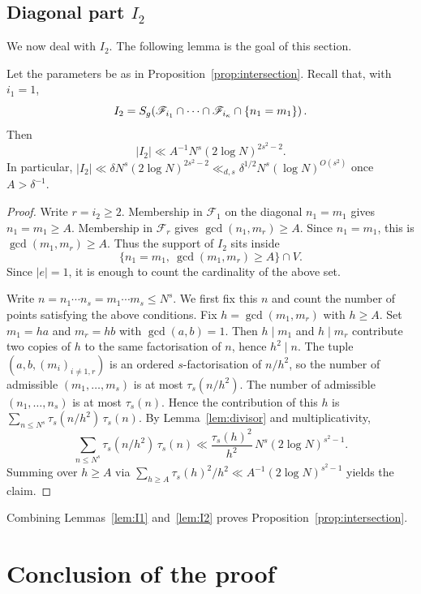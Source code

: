 \subsection{\texorpdfstring{Diagonal part $I_2$}{Diagonal part I_2}}
\label{sec:I2}
We now deal with $I_2$. The following lemma is the goal of this section. 
\begin{lemma}[Diagonal $I_2$]\label{lem:I2}
Let the parameters be as in Proposition~\ref{prop:intersection}.
Recall that, with $i_1=1$,
\[
I_2=S_g\!\left(\mathscr{F}_{i_1}\cap\cdots\cap\mathscr{F}_{i_\kappa}\cap\{n_1=m_1\}\right).
\]
Then
\[
|I_2|\ll A^{-1}N^s(2\log N)^{2s^2-2}.
\]
In particular, $|I_2|\ll\delta N^s(2\log N)^{2s^2-2}\ll_{d,s}\delta^{1/2} N^s(\log N)^{O(s^2)}$ once $A>\delta^{-1}$.
\end{lemma}
\begin{proof}
Write $r=i_2\geq 2$.
Membership in $\mathscr{F}_1$ on the diagonal $n_1=m_1$ gives $n_1=m_1\geq A$.
Membership in $\mathscr{F}_r$ gives $\gcd(n_1,m_r)\geq A$. Since $n_1=m_1$, this is $\gcd(m_1,m_r)\geq A$.
Thus the support of $I_2$ sits inside
\[
\{n_1=m_1,\ \gcd(m_1,m_r)\geq A\}\cap V.
\]
Since $|e|=1$, it is enough to count the cardinality of the above set.

Write $n=n_1\cdots n_s=m_1\cdots m_s\leq N^s$. We first fix this $n$ and count the number of points satisfying the above conditions.
Fix $h=\gcd(m_1,m_r)$ with $h\geq A$.
Set $m_1=ha$ and $m_r=hb$ with $\gcd(a,b)=1$.
Then $h\mid m_1$ and $h\mid m_r$ contribute two copies of $h$ to the same factorisation of $n$, hence $h^2\mid n$.
The tuple $(a,b,(m_i)_{i\neq 1,r})$ is an ordered $s$-factorisation of
$n/h^2$, so the number of admissible $(m_1,\ldots,m_s)$ is at most $\tau_s(n/h^2)$.
The number of admissible $(n_1,\ldots,n_s)$ is at most $\tau_s(n)$.
Hence the contribution of this $h$ is $\sum_{n\leq N^s}\tau_s(n/h^2)\,\tau_s(n)$.
By Lemma~\ref{lem:divisor} and multiplicativity,
\[
\sum_{n\leq N^s}\tau_s(n/h^2)\,\tau_s(n)
\ll \frac{\tau_s(h)^2}{h^2}\,N^s(2\log N)^{s^2-1}.
\]
Summing over $h\geq A$ via $\sum_{h\geq A}\tau_s(h)^2/h^2\ll A^{-1}(2\log N)^{s^2-1}$ yields the claim.
\end{proof}

Combining Lemmas~\ref{lem:I1} and~\ref{lem:I2} proves Proposition~\ref{prop:intersection}.

\section{Conclusion of the proof}
\label{sec:conclusion}


